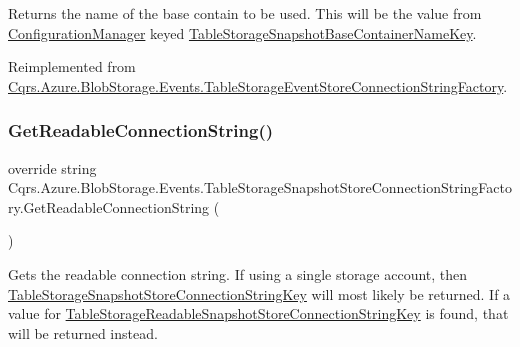 Returns the name of the base contain to be used. This will be the value from \hyperlink{namespaceCqrs_1_1Azure_1_1ConfigurationManager}{Configuration\+Manager} keyed \hyperlink{classCqrs_1_1Azure_1_1BlobStorage_1_1Events_1_1TableStorageSnapshotStoreConnectionStringFactory_a7bfe58a97886ad7832d5640b626c1ee5_a7bfe58a97886ad7832d5640b626c1ee5}{Table\+Storage\+Snapshot\+Base\+Container\+Name\+Key}. 



Reimplemented from \hyperlink{classCqrs_1_1Azure_1_1BlobStorage_1_1Events_1_1TableStorageEventStoreConnectionStringFactory_a118388598a7fa653122fc11521c915d7_a118388598a7fa653122fc11521c915d7}{Cqrs.\+Azure.\+Blob\+Storage.\+Events.\+Table\+Storage\+Event\+Store\+Connection\+String\+Factory}.

\mbox{\label{classCqrs_1_1Azure_1_1BlobStorage_1_1Events_1_1TableStorageSnapshotStoreConnectionStringFactory_a092e6f4132d8cb0c1b25e0c19a3911ba_a092e6f4132d8cb0c1b25e0c19a3911ba}} 
\subsubsection{\texorpdfstring{Get\+Readable\+Connection\+String()}{GetReadableConnectionString()}}
{\footnotesize\ttfamily override string Cqrs.\+Azure.\+Blob\+Storage.\+Events.\+Table\+Storage\+Snapshot\+Store\+Connection\+String\+Factory.\+Get\+Readable\+Connection\+String (\begin{DoxyParamCaption}{ }\end{DoxyParamCaption})\hspace{0.3cm}{\ttfamily [virtual]}}



Gets the readable connection string. If using a single storage account, then \hyperlink{classCqrs_1_1Azure_1_1BlobStorage_1_1Events_1_1TableStorageSnapshotStoreConnectionStringFactory_aeb34e21116be39f3f34e5970001f3762_aeb34e21116be39f3f34e5970001f3762}{Table\+Storage\+Snapshot\+Store\+Connection\+String\+Key} will most likely be returned. If a value for \hyperlink{classCqrs_1_1Azure_1_1BlobStorage_1_1Events_1_1TableStorageSnapshotStoreConnectionStringFactory_add2ff350d26fed88d8c18737d3895663_add2ff350d26fed88d8c18737d3895663}{Table\+Storage\+Readable\+Snapshot\+Store\+Connection\+String\+Key} is found, that will be returned instead. 



